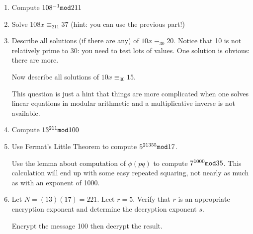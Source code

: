 \documentclass[12pt]{article}
\begin{document}
\begin{enumerate}

\item  Compute $108^{-1} {\tt mod} 211$

\item  Solve $108x \equiv_{211}  37$  (hint:  you can use the previous part!)

\item  Describe all solutions (if there are any) of $10x \equiv_{30} 20$.  Notice that 10 is not relatively prime to 30:  you need to test lots of values.  One solution is obvious:  there are more.

Now describe all solutions of $10x \equiv_{30} 15$.

This question is just a hint that things are more complicated when one solves linear equations in modular arithmetic and a multiplicative inverse is not available.

\item  Compute $13^{211} {\tt mod} 100$

\item  Use Fermat's Little Theorem to compute $5^{21355} {\tt mod} 17$.

Use the lemma about computation of $\phi(pq)$ to compute $7^{1000} {\tt mod} 35$.  This calculation will end up with some easy repeated squaring, not nearly as much as with an exponent of 1000.

\item  Let $N = (13)(17) = 221$.  Leet $r=5$.   Verify that $r$ is an appropriate encryption exponent
and determine the decryption exponent $s$.

Encrypt the message 100 then decrypt the result.


\end{enumerate}
\end{document}
